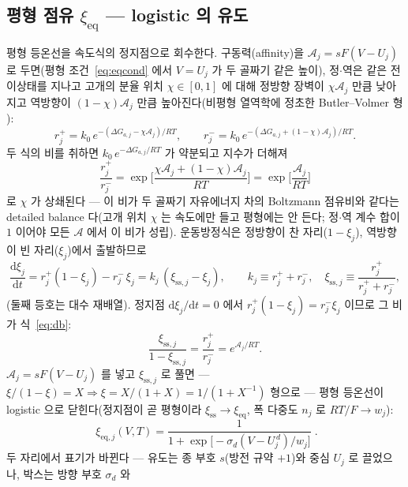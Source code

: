 \documentclass[11pt,a4paper]{article}
\newcommand{\dd}{\mathrm{d}}
\newcommand{\eq}{\mathrm{eq}}
\newcommand{\sstat}{\mathrm{ss}}
\begin{document}
\subsection{평형 점유 $\xi_\eq$ — logistic 의 유도}
평형 등온선을 속도식의 정지점으로 회수한다. 구동력(affinity)을 $\mathcal A_j=sF(V-U_j)$ 로 두면(평형 조건~\eqref{eq:eqcond}
에서 $V=U_j$ 가 두 골짜기 같은 높이), 정$\cdot$역은 같은 전이상태를 지나고 고개의 분율 위치 $\chi\in[0,1]$ 에 대해
정방향 장벽이 $\chi\mathcal A_j$ 만큼 낮아지고 역방향이 $(1-\chi)\mathcal A_j$ 만큼 높아진다(비평형 열역학에 정초한
Butler--Volmer 형 \cite{bazant2013}):
\begin{equation}
r_j^+=k_0\,e^{-(\Delta G_{a,j}-\chi\mathcal A_j)/RT},\qquad
r_j^-=k_0\,e^{-(\Delta G_{a,j}+(1-\chi)\mathcal A_j)/RT}.
\label{eq:bv}
\end{equation}
두 식의 비를 취하면 $k_0\,e^{-\Delta G_{a,j}/RT}$ 가 약분되고 지수가 더해져
\begin{equation}
\frac{r_j^+}{r_j^-}
=\exp\!\Big[\frac{\chi\mathcal A_j+(1-\chi)\mathcal A_j}{RT}\Big]
=\exp\!\Big[\frac{\mathcal A_j}{RT}\Big]
\label{eq:db}
\end{equation}
로 $\chi$ 가 상쇄된다 --- 이 비가 두 골짜기 자유에너지 차의 Boltzmann 점유비와 같다는 detailed balance 다(고개 위치
$\chi$ 는 속도에만 들고 평형에는 안 든다; 정$\cdot$역 계수 합이 $1$ 이어야 모든 $\mathcal A$ 에서 이 비가 성립). 운동방정식은
정방향이 찬 자리($1-\xi_j$), 역방향이 빈 자리($\xi_j$)에서 출발하므로
\begin{equation}
\frac{\dd\xi_j}{\dd t}=r_j^+(1-\xi_j)-r_j^-\,\xi_j
=k_j\,(\xi_{\sstat,j}-\xi_j),\qquad
k_j\equiv r_j^++r_j^-,\quad\xi_{\sstat,j}\equiv\frac{r_j^+}{r_j^++r_j^-},
\label{eq:relax}
\end{equation}
(둘째 등호는 대수 재배열). 정지점 $\dd\xi_j/\dd t=0$ 에서 $r_j^+(1-\xi_j)=r_j^-\xi_j$ 이므로 그 비가 식~\eqref{eq:db}:
\begin{equation}
\frac{\xi_{\sstat,j}}{1-\xi_{\sstat,j}}=\frac{r_j^+}{r_j^-}=e^{\mathcal A_j/RT}.
\label{eq:stationary}
\end{equation}
$\mathcal A_j=sF(V-U_j)$ 를 넣고 $\xi_{\sstat,j}$ 로 풀면 --- $\xi/(1-\xi)=X\Rightarrow\xi=X/(1+X)=1/(1+X^{-1})$
형으로 --- 평형 등온선이 logistic 으로 닫힌다(정지점이 곧 평형이라 $\xi_\sstat\to\xi_\eq$, 폭 다중도 $n_j$ 로
$RT/F\to w_j$):
\begin{equation}
\boxed{\;\xi_{\eq,j}(V,T)=\frac{1}{1+\exp\!\big[-\sigma_d(V-U_j^{\,d})/w_j\big]}\;.}
\label{eq:xieq}
\end{equation}
두 자리에서 표기가 바뀐다 --- 유도는 종 부호 $s$(방전 규약 $+1$)와 중심 $U_j$ 로 끌었으나, 박스는 방향 부호 $\sigma_d$ 와
\end{document}
